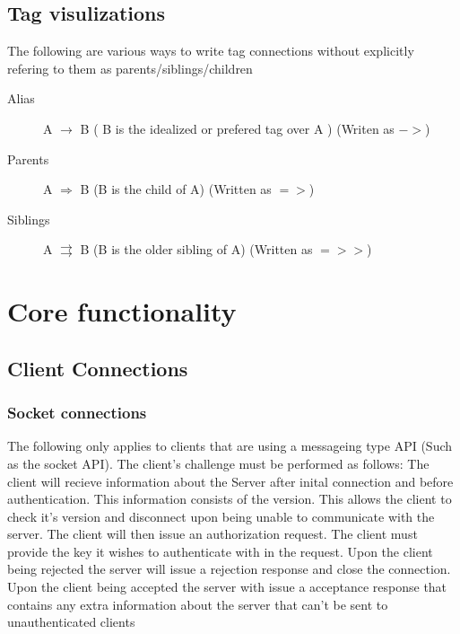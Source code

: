 \documentclass[11pt]{article}
\begin{document}
	\subsection[tags-visual]{Tag visulizations}
	The following are various ways to write tag connections without explicitly refering to them as parents/siblings/children
	\begin{description}
		\item[Alias] A $\rightarrow$ B ( B is the idealized or prefered tag over A ) (Writen as $->$)
		\item[Parents] A $\Rightarrow$ B (B is the child of A) (Written as $=>$)
		\item[Siblings] A $\rightrightarrows$ B (B is the older sibling of A) (Written as $=>>$)
	\end{description}



	\section{Core functionality}


	\subsection[client-connection]{Client Connections}
	\subsubsection[socket-connection]{Socket connections}
	The following only applies to clients that are using a messageing type API (Such as the socket API).\newline
	The client's challenge must be performed as follows:\newline
	The client will recieve information about the Server after inital connection and before authentication. This information consists of the version. This allows the client to check it's version and disconnect upon being unable to communicate with the server.\newline
	The client will then issue an authorization request. The client must provide the key it wishes to authenticate with in the request. \newline
	Upon the client being rejected the server will issue a rejection response and close the connection.\newline
	Upon the client being accepted the server with issue a acceptance response that contains any extra information about the server that can't be sent to unauthenticated clients
\end{document}
